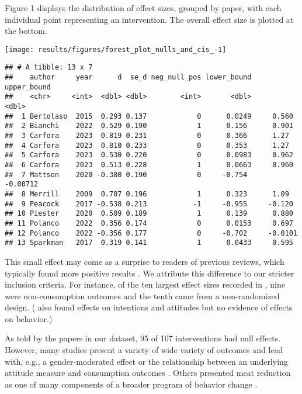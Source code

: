 \documentclass[sn-nature,pdflatex]{sn-jnl}
\begin{document}
Figure 1 displays the distribution of effect sizes, grouped by paper,
with each individual point representing an intervention. The overall
effect size is plotted at the bottom.

\texttt{[image: results/figures/forest\_plot\_nulls\_and\_cis\_-1]}

\begin{verbatim}
## # A tibble: 13 x 7
##    author     year      d  se_d neg_null_pos lower_bound upper_bound
##    <chr>     <int>  <dbl> <dbl>        <int>       <dbl>       <dbl>
##  1 Bertolaso  2015  0.293 0.137            0      0.0249     0.560  
##  2 Bianchi    2022  0.529 0.190            1      0.156      0.901  
##  3 Carfora    2023  0.819 0.231            0      0.366      1.27   
##  4 Carfora    2023  0.810 0.233            0      0.353      1.27   
##  5 Carfora    2023  0.530 0.220            0      0.0983     0.962  
##  6 Carfora    2023  0.513 0.228            1      0.0663     0.960  
##  7 Mattson    2020 -0.380 0.190            0     -0.754     -0.00712
##  8 Merrill    2009  0.707 0.196            1      0.323      1.09   
##  9 Peacock    2017 -0.538 0.213           -1     -0.955     -0.120  
## 10 Piester    2020  0.509 0.189            1      0.139      0.880  
## 11 Polanco    2022  0.356 0.174            0      0.0153     0.697  
## 12 Polanco    2022 -0.356 0.177            0     -0.702     -0.0101 
## 13 Sparkman   2017  0.319 0.141            1      0.0433     0.595
\end{verbatim}

This small effect may come as a surprise to readers of previous reviews,
which typically found more positive results
\citep{mathur2021meta, meier2022, chang2023}. We attribute this
difference to our stricter inclusion criteria. For instance, of the ten
largest effect sizes recorded in \citep{mathur2021effectiveness}, nine
were non-consumption outcomes and the tenth came from a non-randomized
design. (\citep{bianchi2018conscious} also found effects on intentions
and attitudes but no evidence of effects on behavior.)

As told by the papers in our dataset, 95 of 107 interventions had null
effects. However, many studies present a variety of wide variety of
outcomes and lead with, e.g., a gender-moderated effect
\citep{piester2020} or the relationship between an underlying attitude
measure and consumption outcomes \citep{berndsen2005}. Others presented
meat reduction as one of many components of a broader program of
behavior change \citep{abrahamse2007}.
\end{document}

